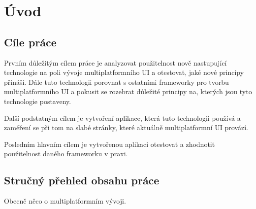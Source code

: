 \chapter{Úvod}
\setcounter{page}{1}


\section{Cíle práce}
Prvním důležitým cílem práce je analyzovat použitelnost nově nastupující technologie na poli vývoje multiplatformního UI a otestovat, jaké
nové principy přináší. Dále tuto technologii porovnat s ostatními frameworky pro tvorbu multiplatformního UI a pokusit se
rozebrat důležité principy na, kterých jsou tyto technologie postaveny. 

Další podstatným cílem je vytvoření aplikace, která tuto technologii používá a zaměření se při tom na slabé stránky, 
které aktuálně multiplatformní UI provází.

Posledním hlavním cílem je vytvořenou aplikaci otestovat a zhodnotit použitelnost daného frameworku v praxi.

\section{Stručný přehled obsahu práce}

Obecně něco o multiplatformním vývoji.


